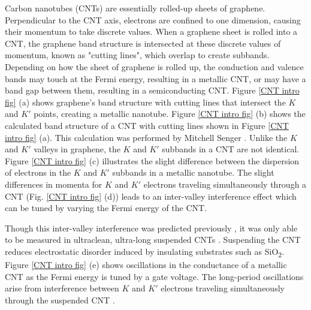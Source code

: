 \documentclass[double,12pt,1in]{beavtex}
\begin{document}
Carbon nanotubes (CNTs) are essentially rolled-up sheets of graphene. Perpendicular to the CNT axis, electrons are confined to one dimension, causing their momentum to take discrete values. When a graphene sheet is rolled into a CNT, the graphene band structure is intersected at these discrete values of momentum, known as "cutting lines", which overlap to create subbands. Depending on how the sheet of graphene is rolled up, the conduction and valence bands may touch at the Fermi energy, resulting in a metallic CNT, or may have a band gap between them, resulting in a semiconducting CNT. Figure \ref{CNT intro fig} (a) shows graphene's band structure with cutting lines that intersect the $K$ and $K'$ points, creating a metallic nanotube. Figure \ref{CNT intro fig} (b) shows the calculated band structure of a CNT with cutting lines shown in  Figure \ref{CNT intro fig} (a). This calculation was performed by Mitchell Senger \cite{senger_optoelectronics_2021}. Unlike the $K$ and $K'$ valleys in graphene, the $K$ and $K'$ subbands in a CNT are not identical. Figure \ref{CNT intro fig} (c) illustrates the slight difference between the dispersion of electrons in the $K$ and $K'$ subbands in a metallic nanotube. The slight differences in momenta for $K$ and $K'$ electrons traveling simultaneously through a CNT (Fig. \ref*{CNT intro fig} (d)) leads to an inter-valley interference effect which can be tuned by varying the Fermi energy of the CNT. 

Though this inter-valley interference was predicted previously \cite{refael_sagnac_2007}, it was only able to be measured in ultraclean, ultra-long suspended CNTs \cite{lotfizadeh_quantum_2021}. Suspending the CNT reduces electrostatic disorder induced by insulating substrates such as SiO\textsubscript{2}. Figure \ref{CNT intro fig} (e) shows oscillations in the conductance of a metallic CNT as the Fermi energy is tuned by a gate voltage. The long-period oscillations arise from interference between $K$ and $K'$ electrons traveling simultaneously through the suspended CNT \cite{lotfizadeh_quantum_2021}.
\end{document}
